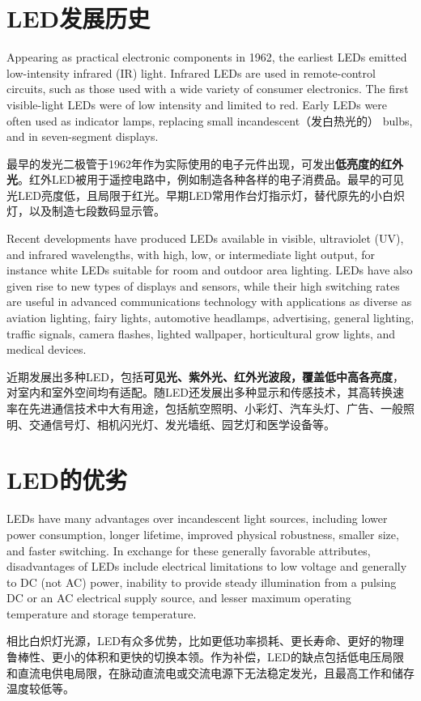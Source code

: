 \documentclass{beamer}
\newenvironment{slide}{
    \begin{frame}{\bfseries{\sectiontitle}}
}{
    \end{frame}
}
\let\sectiononly\section
\renewcommand{\section}[1]{
    \sectiononly{#1}
    \let\sectiontitle\relax
    \newcommand{\sectiontitle}{#1}
}
\begin{document}
\section{LED发展历史}

\begin{slide}
    Appearing as practical electronic components in 1962, the earliest LEDs emitted low-intensity infrared (IR) light. Infrared LEDs are used in remote-control circuits, such as those used with a wide variety of consumer electronics. The first visible-light LEDs were of low intensity and limited to red. Early LEDs were often used as indicator lamps, replacing small incandescent（发白热光的） bulbs, and in seven-segment displays.
    \bigskip

    最早的发光二极管于1962年作为实际使用的电子元件出现，可发出\textbf{低亮度的红外光}。红外LED被用于遥控电路中，例如制造各种各样的电子消费品。最早的可见光LED亮度低，且局限于红光。早期LED常用作台灯指示灯，替代原先的小白炽灯，以及制造七段数码显示管。
\end{slide}

\begin{slide}
    Recent developments have produced LEDs available in visible, ultraviolet (UV), and infrared wavelengths, with high, low, or intermediate light output, for instance white LEDs suitable for room and outdoor area lighting. LEDs have also given rise to new types of displays and sensors, while their high switching rates are useful in advanced communications technology with applications as diverse as aviation lighting, fairy lights, automotive headlamps, advertising, general lighting, traffic signals, camera flashes, lighted wallpaper, horticultural grow lights, and medical devices.
    \bigskip

    近期发展出多种LED，包括\textbf{可见光、紫外光、红外光波段，覆盖低中高各亮度}，对室内和室外空间均有适配。随LED还发展出多种显示和传感技术，其高转换速率在先进通信技术中大有用途，包括航空照明、小彩灯、汽车头灯、广告、一般照明、交通信号灯、相机闪光灯、发光墙纸、园艺灯和医学设备等。
\end{slide}

\section{LED的优劣}

\begin{slide}
    LEDs have many advantages over incandescent light sources, including lower power consumption, longer lifetime, improved physical robustness, smaller size, and faster switching. In exchange for these generally favorable attributes, disadvantages of LEDs include electrical limitations to low voltage and generally to DC (not AC) power, inability to provide steady illumination from a pulsing DC or an AC electrical supply source, and lesser maximum operating temperature and storage temperature.
    \bigskip

    相比白炽灯光源，LED有众多优势，比如更低功率损耗、更长寿命、更好的物理鲁棒性、更小的体积和更快的切换本领。作为补偿，LED的缺点包括低电压局限和直流电供电局限，在脉动直流电或交流电源下无法稳定发光，且最高工作和储存温度较低等。
\end{slide}
\end{document}
